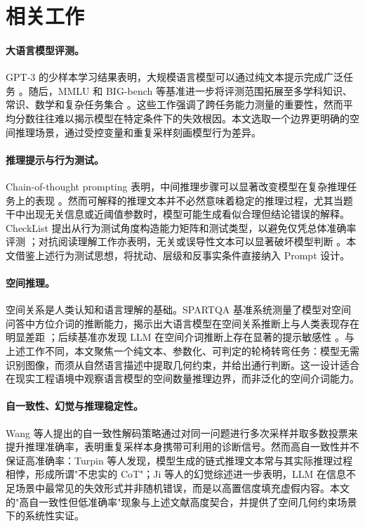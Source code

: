 \section{相关工作}

\paragraph{大语言模型评测。}
GPT-3 的少样本学习结果表明，大规模语言模型可以通过纯文本提示完成广泛任务 \cite{brown2020language}。随后，MMLU 和 BIG-bench 等基准进一步将评测范围拓展至多学科知识、常识、数学和复杂任务集合 \cite{hendrycks2021measuring,srivastava2022beyond}。这些工作强调了跨任务能力测量的重要性，然而平均分数往往难以揭示模型在特定条件下的失效根因。本文选取一个边界更明确的空间推理场景，通过受控变量和重复采样刻画模型行为差异。

\paragraph{推理提示与行为测试。}
Chain-of-thought prompting 表明，中间推理步骤可以显著改变模型在复杂推理任务上的表现 \cite{wei2022chain}。然而可解释的推理文本并不必然意味着稳定的推理过程，尤其当题干中出现无关信息或近阈值参数时，模型可能生成看似合理但结论错误的解释。CheckList 提出从行为测试角度构造能力矩阵和测试类型，以避免仅凭总体准确率评测 \cite{ribeiro-etal-2020-beyond}；对抗阅读理解工作亦表明，无关或误导性文本可以显著破坏模型判断 \cite{jia-liang-2017-adversarial}。本文借鉴上述行为测试思想，将扰动、层级和反事实条件直接纳入 Prompt 设计。

\paragraph{空间推理。}
空间关系是人类认知和语言理解的基础。SPARTQA 基准系统测量了模型对空间问答中方位介词的推断能力，揭示出大语言模型在空间关系推断上与人类表现存在明显差距 \cite{mirzaee2021spartqa}；后续基准亦发现 LLM 在空间介词推断上存在显著的提示敏感性 \cite{comsa-narayanan-2023-benchmark}。与上述工作不同，本文聚焦一个纯文本、参数化、可判定的轮椅转弯任务：模型无需识别图像，而须从自然语言描述中提取几何约束，并给出通行判断。这一设计适合在现实工程语境中观察语言模型的空间数量推理边界，而非泛化的空间介词能力。

\paragraph{自一致性、幻觉与推理稳定性。}
Wang 等人提出的自一致性解码策略通过对同一问题进行多次采样并取多数投票来提升推理准确率\cite{wang2023self}，表明重复采样本身携带可利用的诊断信号。然而高自一致性并不保证高准确率：Turpin 等人发现，模型生成的链式推理文本常与其实际推理过程相悖，形成所谓"不忠实的 CoT"\cite{turpin2023language}；Ji 等人的幻觉综述进一步表明，LLM 在信息不足场景中最常见的失效形式并非随机错误，而是以高置信度填充虚假内容\cite{ji2023survey}。本文的"高自一致性但低准确率"现象与上述文献高度契合，并提供了空间几何约束场景下的系统性实证。

